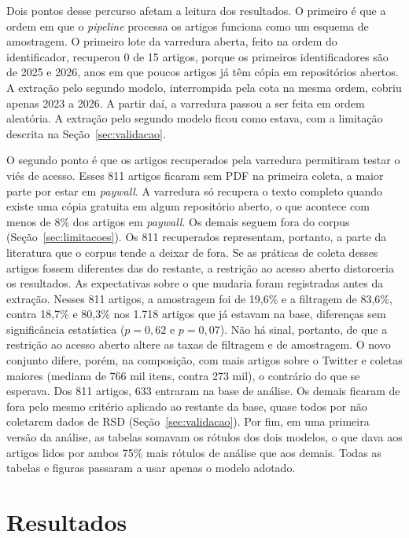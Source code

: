 \documentclass[11pt,a4paper]{article}
\begin{document}
Dois pontos desse percurso afetam a leitura dos resultados. O primeiro é que a
ordem em que o \textit{pipeline} processa os artigos funciona como um esquema de
amostragem. O primeiro lote da varredura aberta, feito na ordem do
identificador, recuperou 0 de 15 artigos, porque os primeiros identificadores
são de 2025 e 2026, anos em que poucos artigos já têm cópia em repositórios abertos. A extração pelo segundo modelo, interrompida pela cota na
mesma ordem, cobriu apenas 2023 a 2026. A partir daí, a varredura passou a ser
feita em ordem aleatória. A extração pelo segundo modelo ficou como estava, com a limitação descrita na Seção~\ref{sec:validacao}.

O segundo ponto é que os artigos recuperados pela varredura permitiram testar o
viés de acesso. Esses 811 artigos ficaram sem PDF na primeira coleta, a maior parte por estar em
\textit{paywall}. A varredura só recupera o texto completo quando existe uma cópia
gratuita em algum repositório aberto, o que acontece com menos de 8\% dos artigos
em \textit{paywall}. Os demais seguem fora do corpus (Seção~\ref{sec:limitacoes}).
Os 811 recuperados representam, portanto, a parte da
literatura que o corpus tende a deixar de fora. Se as práticas de coleta desses
artigos fossem diferentes das do restante, a restrição ao acesso aberto
distorceria os resultados. As expectativas sobre o que mudaria foram registradas
antes da extração. Nesses 811 artigos, a amostragem foi de 19,6\% e a filtragem de
83,6\%, contra 18,7\% e 80,3\% nos 1.718 artigos que já estavam na base, diferenças sem
significância estatística (\(p=0{,}62\) e \(p=0{,}07\)). Não há sinal, portanto, de que a
restrição ao acesso aberto altere as taxas de filtragem e de amostragem. O novo
conjunto difere, porém, na composição, com mais artigos sobre o Twitter e coletas
maiores (mediana de 766 mil itens, contra 273 mil), o contrário do que se esperava.
Dos 811 artigos, 633 entraram na base de análise. Os demais ficaram de fora pelo
mesmo critério aplicado ao restante da base, quase todos por não coletarem dados
de RSD (Seção~\ref{sec:validacao}). Por fim, em
uma primeira versão da análise, as tabelas somavam os rótulos dos dois modelos,
o que dava aos artigos lidos por ambos 75\% mais rótulos de análise que aos
demais. Todas as tabelas e figuras passaram a usar apenas o modelo adotado.

\section{Resultados}
\label{sec:resultados}
\end{document}
